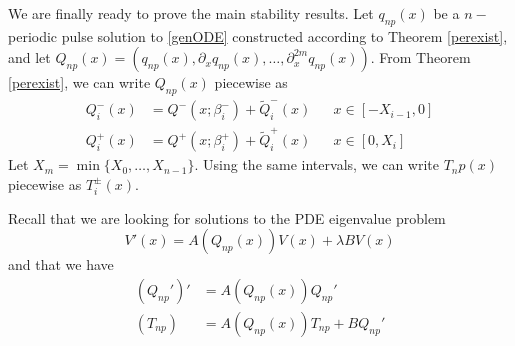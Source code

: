 \documentclass[thesis.tex]{subfiles}
\begin{document}
We are finally ready to prove the main stability results. Let $q_{np}(x)$ be a $n-$periodic pulse solution to \eqref{genODE} constructed according to Theorem \ref{perexist}, and let $Q_{np}(x) = (q_{np}(x), \partial_x q_{np}(x), \dots, \partial_x^{2m} q_{np}(x) )$. From Theorem \ref{perexist}, we can write $Q_{np}(x)$ piecewise as
\begin{equation}\label{Qnppiece}
\begin{aligned}
Q_i^-(x) &= Q^-(x; \beta_i^-) + \tilde{Q}_i^-(x) && x \in [-X_{i-1}, 0] \\
Q_i^+(x) &= Q^+(x; \beta_i^+) + \tilde{Q}_i^+(x) && x \in [0, X_i]
\end{aligned}
\end{equation}
Let $X_m = \min\{X_0, \dots, X_{n-1}\}$. Using the same intervals, we can write $T_np(x)$ piecewise as $T_i^\pm(x)$. 

Recall that we are looking for solutions to the PDE eigenvalue problem
\begin{equation}\label{PDEeig4}
V'(x) = A(Q_{np}(x))V(x) + \lambda B V(x)
\end{equation}
and that we have
\begin{equation}\label{Arelations}
\begin{aligned}
(Q_{np}')' &= A(Q_{np}(x)) Q_{np}' \\
(T_{np}) &= A(Q_{np}(x)) T_{np} + B Q_{np}' 
\end{aligned}
\end{equation}
\end{document}
